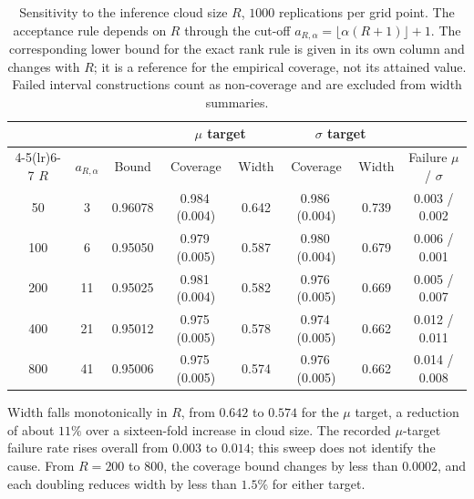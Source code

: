 \begin{table}[!htbp]
\centering
\caption{Sensitivity to the inference cloud size $R$, $1000$ replications
per grid point. The acceptance rule depends on $R$ through the cut-off
$a_{R,\alpha}=\lfloor\alpha(R+1)\rfloor+1$. The corresponding lower bound
for the exact rank rule is given in its own column and changes with $R$;
it is a reference for the empirical coverage, not its attained value.
Failed interval constructions count as non-coverage and are excluded from
width summaries.}
\label{tab:sens-R}
\small
\begin{tabular}{cccccccc}
\toprule
& & & \multicolumn{2}{c}{$\mu$ target} & \multicolumn{2}{c}{$\sigma$ target} & \\
\cmidrule(lr){4-5}\cmidrule(lr){6-7}
$R$ & $a_{R,\alpha}$ & Bound & Coverage & Width & Coverage & Width & Failure $\mu$ / $\sigma$ \\
\midrule
50 & 3 & 0.96078 & 0.984\,(0.004) & 0.642 & 0.986\,(0.004) & 0.739 & 0.003 / 0.002 \\
100 & 6 & 0.95050 & 0.979\,(0.005) & 0.587 & 0.980\,(0.004) & 0.679 & 0.006 / 0.001 \\
200 & 11 & 0.95025 & 0.981\,(0.004) & 0.582 & 0.976\,(0.005) & 0.669 & 0.005 / 0.007 \\
400 & 21 & 0.95012 & 0.975\,(0.005) & 0.578 & 0.974\,(0.005) & 0.662 & 0.012 / 0.011 \\
800 & 41 & 0.95006 & 0.975\,(0.005) & 0.574 & 0.976\,(0.005) & 0.662 & 0.014 / 0.008 \\
\bottomrule
\end{tabular}

\vspace{2pt}
\begin{minipage}{.94\linewidth}\footnotesize
Width falls monotonically in $R$, from $0.642$ to $0.574$ for the $\mu$
target, a reduction of about $11\%$ over a sixteen-fold increase in cloud
size. The recorded $\mu$-target failure rate rises overall from $0.003$
to $0.014$; this sweep does not identify the cause. From $R=200$ to $800$,
the coverage bound changes by less than $0.0002$, and each doubling reduces
width by less than $1.5\%$ for either target.
\end{minipage}
\end{table}
